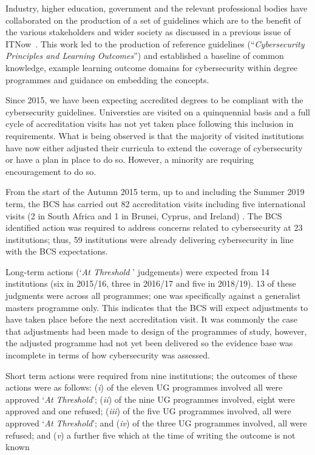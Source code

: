 \documentclass[a4paper,11pt]{article}
\begin{document}
Industry, higher education, government and the relevant professional bodies have collaborated on the production of a set of guidelines which are to the benefit of the various stakeholders and wider society as discussed in a previous issue of ITNow~\cite{Irons2016}. This work led to the production of reference guidelines (``{\emph{Cybersecurity Principles and Learning Outcomes}}'')  and established a baseline of common knowledge, example learning outcome domains for cybersecurity within  degree programmes and guidance on embedding the concepts. 

Since 2015, we have been expecting accredited degrees to be compliant with the cybersecurity guidelines. Universties are visited on a quinquennial basis and a full cycle of accreditation visits has not yet taken place following this inclusion in requirements. What is being observed is that the majority of visited institutions have now either adjusted their curricula to extend the coverage of cybersecurity or have a plan in place to do so. However, a minority are requiring encouragement to do so.

From the start of the Autumn 2015 term, up to and including the Summer 2019 term, the BCS has carried out 82 accreditation visits including five international visits (2 in South Africa and 1 in Brunei, Cyprus, and Ireland) . The BCS identified action was required to address concerns related to cybersecurity at 23 institutions; thus, 59 institutions were already delivering cybersecurity in line with the BCS expectations.

Long-term actions (`{\emph{At Threshold }}' judgements) were expected from 14 institutions (six in 2015/16, three in 2016/17 and five in 2018/19). 13 of these judgments were across all programmes; one was specifically against a generalist masters programme only. This indicates that the BCS will expect adjustments to have taken place before the next accreditation visit. It was commonly the case that adjustments had been made to design of the programmes of study, however, the adjusted programme had not yet been delivered so the evidence base was incomplete in terms of how cybersecurity was assessed.
 
Short term actions were required from nine institutions; the outcomes of these actions were as follows: ({\emph{i}}) of the eleven UG programmes involved all were approved `{\emph{At Threshold}}'; ({\emph{ii}}) of the nine UG programmes involved, eight were approved and one refused; ({\emph{iii}}) of the five UG programmes involved, all were approved `{\emph{At Threshold}}'; and ({\emph{iv}}) of the three UG programmes involved, all were refused; and ({\emph{v}}) a further five which at the time of writing the outcome is not known
\end{document}
